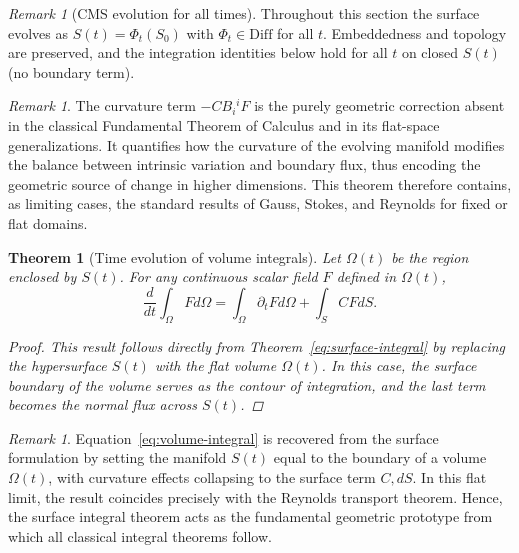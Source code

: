 \documentclass[11pt]{article}
\theoremstyle{definition}
\theoremstyle{plain}
\newtheorem{theorem}[definition]{Theorem}
\theoremstyle{remark}
\newtheorem{remark}[definition]{Remark}
\begin{document}
\begin{remark}[CMS evolution for all times]\label{rem:cms-all-times}
Throughout this section the surface evolves as $S(t)=\Phi_t(S_0)$ with $\Phi_t\in\mathrm{Diff}$ for all $t$. 
Embeddedness and topology are preserved, and the integration identities below hold for all $t$ on closed $S(t)$ (no boundary term).
\end{remark}

\begin{remark}
The curvature term $-C B_i{}^{i}F$ is the purely geometric correction absent in the classical Fundamental Theorem of Calculus and in its flat-space generalizations.
It quantifies how the curvature of the evolving manifold modifies the balance between intrinsic variation and boundary flux, thus encoding the geometric source of change in higher dimensions.
This theorem therefore contains, as limiting cases, the standard results of Gauss, Stokes, and Reynolds for fixed or flat domains.
\end{remark}

\begin{theorem}[Time evolution of volume integrals]\label{thm:volume-integral}
Let $\Omega(t)$ be the region enclosed by $S(t)$.  
For any continuous scalar field $F$ defined in $\Omega(t)$,
\begin{equation}
\label{eq:volume-integral}
\frac{d}{dt}\int_{\Omega} Fd\Omega
=\int_{\Omega} \partial_t F d\Omega + \int_{S} C FdS.
\end{equation}

\begin{proof}
This result follows directly from Theorem~\eqref{eq:surface-integral} 
by replacing the hypersurface $S(t)$ with the flat volume $\Omega(t)$.  
In this case, the surface boundary of the volume serves as the contour of integration, and the last term becomes the normal flux across $S(t)$.
\end{proof}
\end{theorem}

\begin{remark}
Equation~\eqref{eq:volume-integral} is recovered from the surface formulation by setting the manifold $S(t)$ equal to the boundary of a volume $\Omega(t)$, with curvature effects collapsing to the surface term $C,dS$.
In this flat limit, the result coincides precisely with the Reynolds transport theorem.
Hence, the surface integral theorem acts as the fundamental geometric prototype from which all classical integral theorems follow.
\end{remark}
\end{document}
